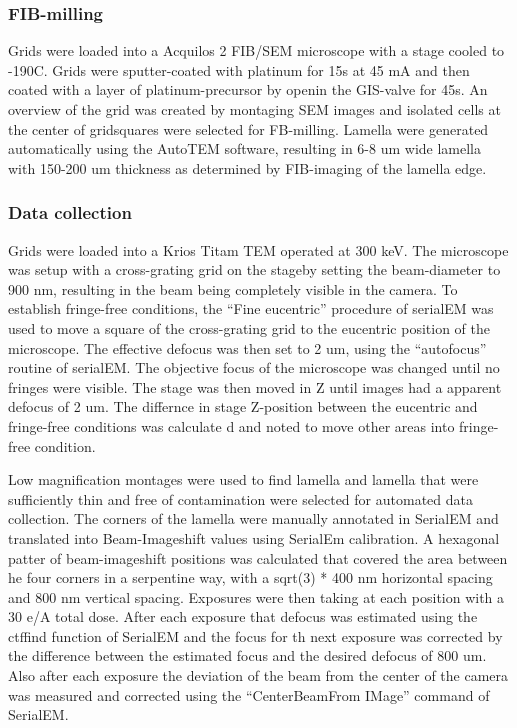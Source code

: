 \documentclass[
]{article}
\begin{document}
\hypertarget{fib-milling}{%
\subsubsection{FIB-milling}\label{fib-milling}}

Grids were loaded into a Acquilos 2 FIB/SEM microscope with a stage cooled to
-190C. Grids were sputter-coated with platinum for 15s at 45 mA and then coated
with a layer of platinum-precursor by openin the GIS-valve for 45s. An overview
of the grid was created by montaging SEM images and isolated cells at the center
of gridsquares were selected for FB-milling. Lamella were generated
automatically using the AutoTEM software, resulting in 6-8 um wide lamella with
150-200 um thickness as determined by FIB-imaging of the lamella edge.

\hypertarget{data-collection}{%
\subsubsection{Data collection}\label{data-collection}}

Grids were loaded into a Krios Titam TEM operated at 300 keV. The microscope was
setup with a cross-grating grid on the stageby setting the beam-diameter to 900
nm, resulting in the beam being completely visible in the camera. To establish
fringe-free conditions, the ``Fine eucentric'' procedure of serialEM was used to
move a square of the cross-grating grid to the eucentric position of the
microscope. The effective defocus was then set to 2 um, using the ``autofocus''
routine of serialEM. The objective focus of the microscope was changed until no
fringes were visible. The stage was then moved in Z until images had a apparent
defocus of 2 um. The differnce in stage Z-position between the eucentric and
fringe-free conditions was calculate d and noted to move other areas into
fringe-free condition.

Low magnification montages were used to find lamella and lamella that were
sufficiently thin and free of contamination were selected for automated data
collection. The corners of the lamella were manually annotated in SerialEM and
translated into Beam-Imageshift values using SerialEm calibration. A hexagonal
patter of beam-imageshift positions was calculated that covered the area between
he four corners in a serpentine way, with a sqrt(3) * 400 nm horizontal spacing
and 800 nm vertical spacing. Exposures were then taking at each position with a
30 e/A total dose. After each exposure that defocus was estimated using the
ctffind function of SerialEM and the focus for th next exposure was corrected by
the difference between the estimated focus and the desired defocus of 800 um.
Also after each exposure the deviation of the beam from the center of the camera
was measured and corrected using the ``CenterBeamFrom IMage'' command of SerialEM.
\end{document}
